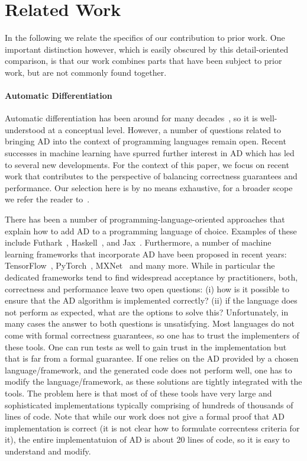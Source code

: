\section{Related Work\label{sec:relatedwork}}

In the following we relate the specifics of our contribution to prior
work. One important distinction however, which is easily obscured by
this detail-oriented comparison, is that our work combines parts that
have been subject to prior work, but are not commonly found together.

\paragraph{Automatic Differentiation}

Automatic differentiation has been around for many decades~\cite{early-ad1, early-ad2},
so it is well-understood at a conceptual level.  However,
a number of questions related to bringing AD into the context of
programming languages remain open.  Recent successes in machine learning
have spurred further interest in AD which has led to several new developments.
For the context of this paper, we focus on recent work that contributes to 
the perspective of balancing correctness guarantees and performance.
Our selection here is by no means exhaustive, for
a broader scope we refer the reader to~\cite{autodiff-survey}.

There has been a number of programming-language-oriented approaches that explain
how to add AD to a programming language of choice. Examples of these include
Futhark~\cite{futhark/sc22ad}, Haskell~\cite{ad-haskell}, and
Jax~\cite{ad-jax,radul2023you}. Furthermore, a number of machine learning
frameworks that incorporate AD have been proposed in recent years: TensorFlow~\cite{ad-tf},
PyTorch~\cite{ad-pytorch}, MXNet~\cite{ad-mxnet} and many more.
While in particular the dedicated frameworks tend to find widespread 
acceptance by practitioners, both, correctness and performance leave
two open questions: (i) how is it possible to
ensure that the AD algorithm is implemented correctly?
(ii) if the
language does not perform as expected, what are the
options to solve this?  Unfortunately, in many cases the answer to
both questions is unsatisfying.  Most languages do not
come with formal correctness guarantees, so one has to trust the
implementers of these tools.  One can run tests as well to gain trust 
in the implementation but that is far from a 
formal guarantee.  If one relies
on the AD provided by a chosen language/framework, and the generated code does not
perform well, one has to modify the language/framework, as these solutions
are tightly integrated with the tools. The problem here is that most of of these tools
have very large and sophisticated implementations typically comprising
of hundreds of thousands of lines of code.  Note that while our work
does not give a formal proof that AD implementation is correct (it is
not clear how to formulate correcntess criteria for it), the entire
implementatuion of AD is about 20 lines of code, so it is easy to
understand and modify.

